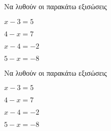 Να λυθούν οι παρακάτω εξισώσεις
\begin{alist}
\item $ x-3=5 $
\item $ 4-x=7 $
\item $ x-4=-2 $
\item $ 5-x=-8 $
\end{alist}
Να λυθούν οι παρακάτω εξισώσεις
\begin{alist}
\item $ x-3=5 $
\item $ 4-x=7 $
\item $ x-4=-2 $
\item $ 5-x=-8 $
\end{alist}
